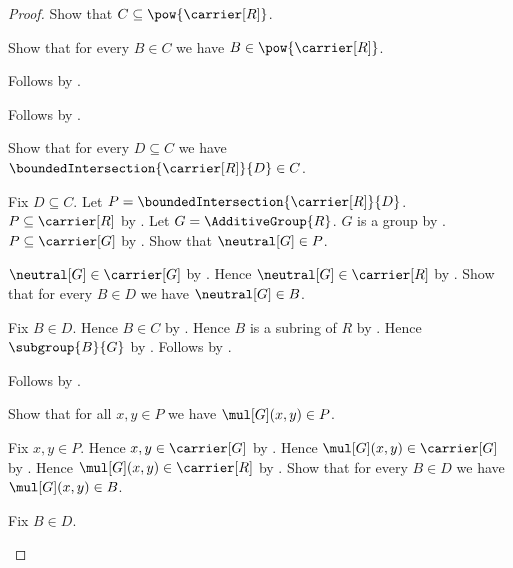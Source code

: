 \begin{proof}
    Show that $C\subseteq\pow{\carrier[R]}$.
    \begin{subproof}
        Show that for every $B\in C$ we have
            $B\in\pow{\carrier[R]}$.
        \begin{subproof}
            Follows by \auto.
        \end{subproof}
        Follows by .
    \end{subproof}
    Show that for every $D\subseteq C$ we have
        $\boundedIntersection{\carrier[R]}{D}\in C$.
    \begin{subproof}
        Fix $D\subseteq C$.
        Let $P=\boundedIntersection{\carrier[R]}{D}$.
        $P\subseteq\carrier[R]$ by
            .
        Let $G=\AdditiveGroup{R}$.
        $G$ is a group by
            .
        $P\subseteq\carrier[G]$ by .
        Show that $\neutral[G]\in P$.
        \begin{subproof}
            $\neutral[G]\in\carrier[G]$ by
                .
            Hence $\neutral[G]\in\carrier[R]$ by
                .
            Show that for every $B\in D$ we have $\neutral[G]\in B$.
            \begin{subproof}
                Fix $B\in D$.
                Hence $B\in C$ by .
                Hence $B$ is a subring of $R$ by \auto.
                Hence $\subgroup{B}{G}$ by
                    .
                Follows by .
            \end{subproof}
            Follows by .
        \end{subproof}
        Show that for all $x,y\in P$ we have $\mul[G](x,y)\in P$.
        \begin{subproof}
            Fix $x,y\in P$.
            Hence $x,y\in\carrier[G]$ by .
            Hence $\mul[G](x,y)\in\carrier[G]$ by
                .
            Hence $\mul[G](x,y)\in\carrier[R]$ by
                .
            Show that for every $B\in D$ we have $\mul[G](x,y)\in B$.
            \begin{subproof}
                Fix $B\in D$.

\end{subproof}
\end{subproof}
\end{subproof}
\end{proof}
